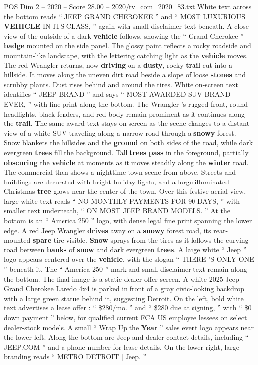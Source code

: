 \begin{textsample}{POS Dim 2 – 2020 – Score 28.00 – 2020/tv\_com\_2020\_83.txt}
White text across the bottom reads “ JEEP GRAND CHEROKEE ” and “ MOST LUXURIOUS \textbf{VEHICLE} IN ITS CLASS, ” again with small disclaimer text beneath.
A close view of the outside of a dark \textbf{vehicle} follows, showing the “ Grand Cherokee ” \textbf{badge} mounted on the side panel.
The glossy paint reflects a rocky roadside and mountain-like landscape, with the lettering catching light as the \textbf{vehicle} moves.
The red Wrangler returns, now \textbf{driving} on a \textbf{dusty}, rocky \textbf{trail} cut into a hillside.
It moves along the uneven dirt road beside a slope of loose \textbf{stones} and scrubby plants.
Dust rises behind and around the tires.
White on-screen text identifies “ JEEP BRAND ” and says “ MOST AWARDED SUV BRAND EVER, ” with fine print along the bottom.
The Wrangler ’s rugged front, round headlights, black fenders, and red body remain prominent as it continues along the \textbf{trail}.
The same award text stays on screen as the scene changes to a distant view of a white SUV traveling along a narrow road through a \textbf{snowy} forest.
Snow blankets the hillsides and the \textbf{ground} on both sides of the road, while dark evergreen \textbf{trees} fill the background.
Tall \textbf{trees} \textbf{pass} in the foreground, partially \textbf{obscuring} the \textbf{vehicle} at moments as it moves steadily along the \textbf{winter} road.
The commercial then shows a nighttime town scene from above.
Streets and buildings are decorated with bright holiday lights, and a large illuminated Christmas \textbf{tree} glows near the center of the town.
Over this festive aerial view, large white text reads “ NO MONTHLY PAYMENTS FOR 90 DAYS, ” with smaller text underneath, “ ON MOST JEEP BRAND MODELS. ” At the bottom is an “ America 250 ” logo, with dense legal fine print spanning the lower edge.
A red Jeep Wrangler \textbf{drives} away on a \textbf{snowy} forest road, its rear-mounted \textbf{spare} tire visible. \textbf{Snow} sprays from the tires as it follows the curving road between \textbf{banks} of \textbf{snow} and dark evergreen \textbf{trees}.
A large white “ Jeep ” logo appears centered over the \textbf{vehicle}, with the slogan “ THERE ’S ONLY ONE ” beneath it.
The “ America 250 ” mark and small disclaimer text remain along the bottom.
The final image is a static dealer-offer screen.
A white 2025 Jeep Grand Cherokee Laredo 4x4 is parked in front of a gray civic-looking backdrop with a large green statue behind it, suggesting Detroit.
On the left, bold white text advertises a lease offer : “ \$280/mo. ” and “ \$280 due at signing, ” with “ \$0 down payment ” below, for qualified current FCA US employee lessees on select dealer-stock models.
A small “ Wrap Up the \textbf{Year} ” sales event logo appears near the lower left.
Along the bottom are Jeep and dealer contact details, including “ JEEP.COM ” and a phone number for lease details.
On the lower right, large branding reads “ METRO DETROIT | Jeep. ”

\end{textsample}
